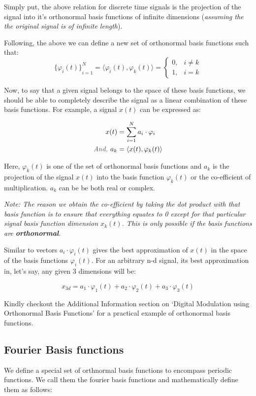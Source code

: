 \documentclass[letterpaper,12pt]{article}
\newcommand{\annot}[1]{\textcolor{darkgray}{\textit{#1}}}
\begin{document}
Simply put, the above relation for discrete time signals is the projection of the signal into it's orthonormal basis functions of infinite dimensions (\textit{assuming the the original signal is of infinite length}).

Following, the above we can define a new set of orthonormal basis functions such that:
\[{\{\varphi_{i}(t)\}}^{N}_{i=1} = \langle \varphi_{i}(t), \varphi_{k}(t)\rangle = \begin{cases}
        0, & i \neq k \\
        1, & i = k
    \end{cases}
\]

Now, to say that a given signal belongs to the space of these basis functions, we should be able to completely describe the signal as a linear combination of these basis functions. For example, a signal $x(t)$ can be expressed as:

\begin{align*}
    x(t)              & = \sum_{i=1}^{N} a_{i} \cdot \varphi_{i} \\
    \annot{And, } a_k & = \langle x(t), \varphi_{k}(t)\rangle
\end{align*}

Here, $\varphi_{k}(t)$ is one of the set of orthonormal basis functions and $a_{k}$ is the projection of the signal $x(t)$ into the basis function $\varphi_{k}(t)$ or the co-efficient of multiplication. $a_{k}$ can be be both real or complex.

\textit{Note: The reason we obtain the co-efficient by taking the dot product with that basis function is to ensure that everything equates to 0 except for that particular signal basis function dimension $x_{k}(t)$. This is only possible if the basis functions are \textbf{orthonormal}.}

Similar to vectors $a_{i} \cdot \varphi_{i}(t)$ gives the best approximation of $x(t)$ in the space of the basis functions $\varphi_{i}(t)$. For an arbitrary n-d signal, its best approximation in, let's say, any given 3 dimensions will be:

\[{x}_{3d} = a_{1}\cdot \varphi_{1}(t) + a_{2}\cdot \varphi_{2}(t) + a_{3}\cdot \varphi_{3}(t)\]

Kindly checkout the Additional Information section on `Digital Modulation using Orthonormal Basis Functions' for a practical example of orthonormal basis functions.

\subsection*{Fourier Basis functions}
We define a special set of orthnormal basis functions to encompass periodic functions. We call them the fourier basis functions and mathematically define them as follows:
\end{document}
